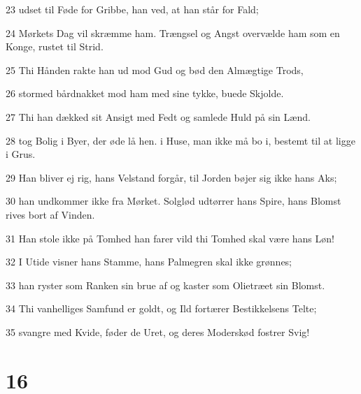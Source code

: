 \par 23 udset til Føde for Gribbe, han ved, at han står for Fald;
\par 24 Mørkets Dag vil skræmme ham. Trængsel og Angst overvælde ham som en Konge, rustet til Strid.
\par 25 Thi Hånden rakte han ud mod Gud og bød den Almægtige Trods,
\par 26 stormed bårdnakket mod ham med sine tykke, buede Skjolde.
\par 27 Thi han dækked sit Ansigt med Fedt og samlede Huld på sin Lænd.
\par 28 tog Bolig i Byer, der øde lå hen. i Huse, man ikke må bo i, bestemt til at ligge i Grus.
\par 29 Han bliver ej rig, hans Velstand forgår, til Jorden bøjer sig ikke hans Aks;
\par 30 han undkommer ikke fra Mørket. Solglød udtørrer hans Spire, hans Blomst rives bort af Vinden.
\par 31 Han stole ikke på Tomhed han farer vild thi Tomhed skal være hans Løn!
\par 32 I Utide visner hans Stamme, hans Palmegren skal ikke grønnes;
\par 33 han ryster som Ranken sin brue af og kaster som Olietræet sin Blomst.
\par 34 Thi vanhelliges Samfund er goldt, og Ild fortærer Bestikkelsens Telte;
\par 35 svangre med Kvide, føder de Uret, og deres Moderskød fostrer Svig!

\chapter{16}


